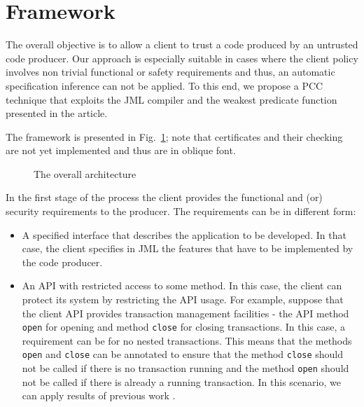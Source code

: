 \section{Framework}
\label{architecture_s}	


The overall objective is to allow a client to trust a code produced by an untrusted code producer. Our approach is especially suitable
 in cases where the client policy involves non trivial functional or safety requirements and thus, an automatic specification inference
 can not be applied. To this end, we propose a PCC technique that exploits the JML compiler and the weakest predicate function presented in the article. 
 
 The framework is presented in Fig.~\ref{architecture}; note that certificates and their checking are not yet implemented
 and thus are in oblique font.
  

\begin{figure}[!tbp]
\begin{center}
\caption{\sc The overall architecture}
\label{architecture}
\end{center}
\end{figure}

In the first stage of the process the client provides the functional and (or) security requirements to the producer.
 The requirements can be in different form:
\begin{itemize}
\item A specified interface that describes the application to be developed. In that case,
 the client specifies in JML the features that have to be implemented by the code producer.
\item An API with restricted access to some method. In this case, the client can protect its system by restricting the API usage.
For example, suppose that the client API provides transaction management facilities - the API method \texttt{open} for opening and method 
\texttt{close} for closing transactions. In this case, a requirement can be for no nested transactions.
This means that the methods \texttt{open} and \texttt{close} can be annotated to ensure that the method \texttt{close} 
 should not be called if there is no transaction running and the method \texttt{open} should not be called if there is already a running transaction. 
In this scenario, we can apply results of previous work \cite{PBBHL}.  
\end{itemize}

